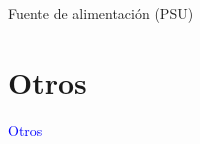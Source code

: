 \documentclass[10pt,xcolor={dvipsnames}]{beamer}
\begin{document}
\begin{frame}{Fuente de alimentación (PSU)}
\begin{center}
\end{center}
\end{frame}


\section{Otros}
\begin{frame}
\begin{center}
\Huge{\textcolor{blue}{Otros}}
\end{center}
\end{frame}
\end{document}

